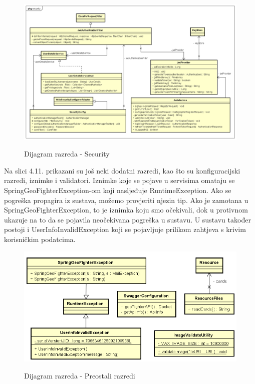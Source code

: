 			\begin{figure}[H]
				\centering
				\includegraphics[scale=0.56]{dijagrami/Security_CD} \\
				\caption{Dijagram razreda - Security}
				\label{fig:Security_CD}
			\end{figure}
			
			\textnormal{
				Na slici 4.11. prikazani su još neki dodatni razredi, kao što su konfiguracijski razredi, iznimke i validatori. Iznimke koje se pojave u servisima omataju se SpringGeoFighterException-om koji nasljeđuje RuntimeException. Ako se pogreška propagira iz sustava, možemo provjeriti njezin tip. Ako je zamotana u SpringGeoFighterException, to je iznimka koju smo očekivali, dok u protivnom ukazuje na to da se pojavila neočekivana pogreška u sustavu. U sustavu također postoji i UserInfoInvalidException koji se pojavljuje prilikom zahtjeva s krivim korisničkim podatcima.
			}
		
			\begin{figure}[H]
				\centering
				\includegraphics[scale=0.75]{dijagrami/Misc_CD} \\
				\caption{Dijagram razreda - Preostali razredi}
				\label{fig:Misc_CD}
			\end{figure}
			
